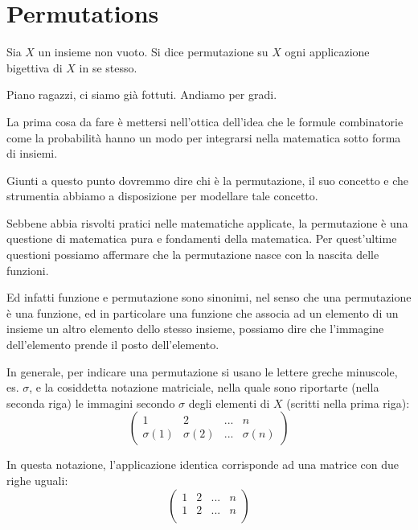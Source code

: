 \chapter{Permutations}

\begin{definizione}
	Sia $X$ un insieme non vuoto. Si dice permutazione su $X$ ogni applicazione bigettiva di $X$ in se stesso.
\end{definizione}

Piano ragazzi, ci siamo gi\`a fottuti. Andiamo per gradi.

La prima cosa da fare \`e mettersi nell'ottica dell'idea che le formule combinatorie come la probabilit\`a hanno un modo per integrarsi nella matematica sotto forma di insiemi.

Giunti a questo punto dovremmo dire chi \`e la permutazione, il suo concetto e che strumentia abbiamo a disposizione per modellare tale concetto.

Sebbene abbia risvolti pratici nelle matematiche applicate, la permutazione \`e una questione di matematica pura e fondamenti della matematica. Per quest'ultime questioni possiamo affermare che la permutazione nasce con la nascita delle funzioni.

Ed infatti funzione e permutazione sono sinonimi, nel senso che una permutazione \`e una funzione, ed in particolare una funzione che associa ad un elemento di un insieme un altro elemento dello stesso insieme, possiamo dire che l'immagine dell'elemento prende il posto dell'elemento.

In generale, per indicare una permutazione si usano le lettere greche minuscole, es. $\sigma$, e la cosiddetta notazione matriciale,
nella quale sono riportarte (nella seconda riga) le immagini secondo $\sigma$ degli elementi di $X$ (scritti nella prima riga):
\[
\left(
\begin{array}{cccc}
1 & 2 & ... & n \\
\sigma(1) & \sigma(2) & ... & \sigma(n)
\end{array}
\right)
\] 

\begin{definizione}
	In questa notazione, l'applicazione identica corrisponde ad una matrice con due righe uguali:
	\[
	\left(
	\begin{array}{cccc}
	1 & 2 & ... & n \\
	1 & 2 & ... & n \\
	\end{array}
	\right)
	\]
\end{definizione}

